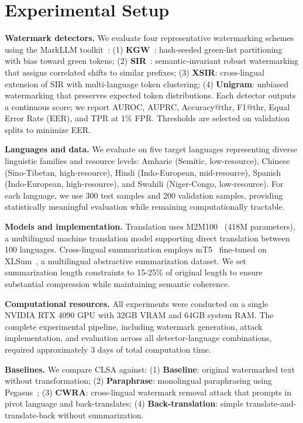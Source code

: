 \documentclass{article}
\begin{document}
\section{Experimental Setup}

\textbf{Watermark detectors.} We evaluate four representative watermarking schemes using the MarkLLM toolkit~\citep{pan2024marklllm}: (1) \textbf{KGW}~\citep{kirchenbauer2023watermark}: hash-seeded green-list partitioning with bias toward green tokens; (2) \textbf{SIR}~\citep{liu2024sir}: semantic-invariant robust watermarking that assigns correlated shifts to similar prefixes; (3) \textbf{XSIR}: cross-lingual extension of SIR with multi-language token clustering; (4) \textbf{Unigram}: unbiased watermarking that preserves expected token distributions. Each detector outputs a continuous score; we report AUROC, AUPRC, Accuracy@thr, F1@thr, Equal Error Rate (EER), and TPR at 1\% FPR. Thresholds are selected on validation splits to minimize EER.

\textbf{Languages and data.} We evaluate on five target languages representing diverse linguistic families and resource levels: Amharic (Semitic, low-resource), Chinese (Sino-Tibetan, high-resource), Hindi (Indo-European, mid-resource), Spanish (Indo-European, high-resource), and Swahili (Niger-Congo, low-resource). For each language, we use 300 test samples and 200 validation samples, providing statistically meaningful evaluation while remaining computationally tractable.

\textbf{Models and implementation.} Translation uses M2M100~\citep{fan2021beyond} (418M parameters), a multilingual machine translation model supporting direct translation between 100 languages. Cross-lingual summarization employs mT5~\citep{xue2021mt5} fine-tuned on XLSum~\citep{hasan2021xl}, a multilingual abstractive summarization dataset. We set summarization length constraints to 15-25\% of original length to ensure substantial compression while maintaining semantic coherence.

\textbf{Computational resources.} All experiments were conducted on a single NVIDIA RTX 4090 GPU with 32GB VRAM and 64GB system RAM. The complete experimental pipeline, including watermark generation, attack implementation, and evaluation across all detector-language combinations, required approximately 3 days of total computation time.

\textbf{Baselines.} We compare CLSA against: (1) \textbf{Baseline}: original watermarked text without transformation; (2) \textbf{Paraphrase}: monolingual paraphrasing using Pegasus~\citep{zhang2020pegasus}; (3) \textbf{CWRA}: cross-lingual watermark removal attack that prompts in pivot language and back-translates; (4) \textbf{Back-translation}: simple translate-and-translate-back without summarization.
\end{document}
